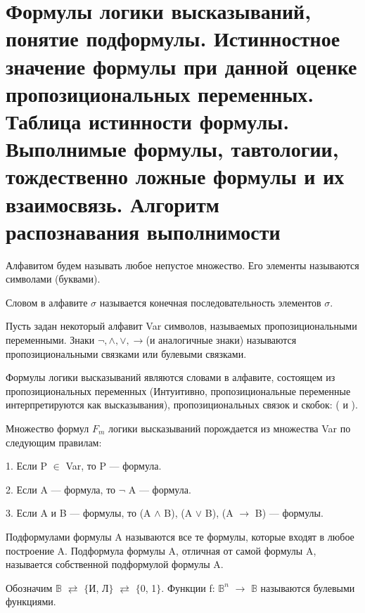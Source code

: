 \section{Формулы логики высказываний, понятие подформулы. Истинностное значение формулы при данной оценке пропозициональных переменных. Таблица истинности формулы. Выполнимые формулы, тавтологии, тождественно ложные формулы и их взаимосвязь. Алгоритм распознавания выполнимости}

\begin{definition}
Алфавитом будем называть любое непустое множество. Его элементы называются символами (буквами).
\end{definition}

\begin{definition}
Словом в алфавите $\sigma$ называется конечная последовательность элементов $\sigma$.
\end{definition}

Пусть задан некоторый алфавит Var символов, называемых пропозициональными переменными. Знаки $\neg, \land, \lor, \to$(и аналогичные знаки) называются пропозициональными связками или булевыми связками.

\begin{definition}
Формулы логики высказываний являются словами в алфавите, состоящем из пропозициональных переменных (Интуитивно,
пропозициональные переменные интерпретируются как высказывания), пропозициональных связок и скобок: ( и ).
\end{definition}

\begin{definition}
Множество формул $F_m$ логики высказываний порождается из множества Var по следующим правилам:

1. Если P $\in$ Var, то P — формула.

2. Если A — формула, то $\neg$ A — формула.

3. Если A и B — формулы, то (A $\land$ B), (A $\lor$ B), (A $\to$ B) — формулы.
\end{definition}

\begin{definition}
Подформулами формулы A называются все те формулы, которые входят в любое построение A. Подформула формулы A,
отличная от самой формулы A, называется собственной подформулой формулы A.
\end{definition}

\begin{definition}
Обозначим $\mathbb{B}$ $\rightleftarrows$ $\{$И, Л$\}$ $\rightleftarrows$ $\{$0, 1$\}$. Функции f: $\mathbb{B}^n$ $\to$ $\mathbb{B}$ называются булевыми функциями.

\end{definition}

